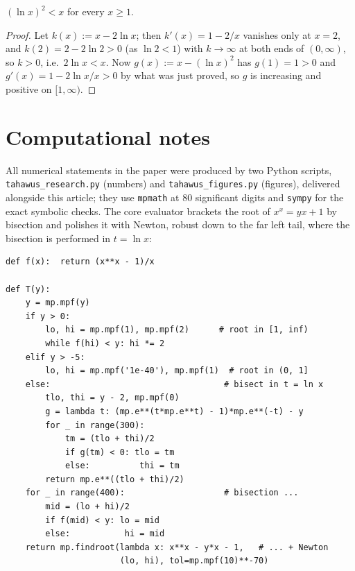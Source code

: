\begin{lemma}\label{lem:logsquare}
$(\ln x)^{2} < x$ for every $x \ge 1$.
\end{lemma}

\begin{proof}
Let $k(x) := x - 2\ln x$; then $k'(x) = 1 - 2/x$ vanishes only at
$x = 2$, and $k(2) = 2 - 2\ln2 > 0$ (as $\ln 2 < 1$) with
$k \to \infty$ at both ends of $(0,\infty)$, so $k > 0$, i.e.\
$2 \ln x < x$. Now $g(x) := x - (\ln x)^{2}$ has
$g(1) = 1 > 0$ and $g'(x) = 1 - 2\ln x / x > 0$ by what was just
proved, so $g$ is increasing and positive on $[1,\infty)$.
\end{proof}

\section{Computational notes}\label{sec:computational}

All numerical statements in the paper were produced by two Python
scripts, \texttt{tahawus\_research.py} (numbers) and
\texttt{tahawus\_figures.py} (figures), delivered alongside this
article; they use \texttt{mpmath} \cite{mpmath} at $80$ significant
digits and \texttt{sympy} for the exact symbolic checks. The core
evaluator brackets the root of $x^{x} = yx + 1$ by bisection and
polishes it with Newton, robust down to the far left tail, where the
bisection is performed in $t = \ln x$:

\begin{small}
\begin{verbatim}
def f(x):  return (x**x - 1)/x

def T(y):
    y = mp.mpf(y)
    if y > 0:
        lo, hi = mp.mpf(1), mp.mpf(2)      # root in [1, inf)
        while f(hi) < y: hi *= 2
    elif y > -5:
        lo, hi = mp.mpf('1e-40'), mp.mpf(1)  # root in (0, 1]
    else:                                   # bisect in t = ln x
        tlo, thi = y - 2, mp.mpf(0)
        g = lambda t: (mp.e**(t*mp.e**t) - 1)*mp.e**(-t) - y
        for _ in range(300):
            tm = (tlo + thi)/2
            if g(tm) < 0: tlo = tm
            else:          thi = tm
        return mp.e**((tlo + thi)/2)
    for _ in range(400):                    # bisection ...
        mid = (lo + hi)/2
        if f(mid) < y: lo = mid
        else:           hi = mid
    return mp.findroot(lambda x: x**x - y*x - 1,   # ... + Newton
                       (lo, hi), tol=mp.mpf(10)**-70)
\end{verbatim}
\end{small}

